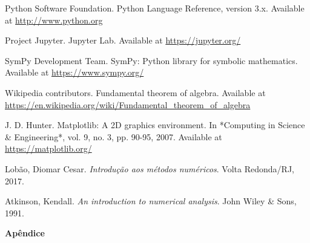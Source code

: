 \documentclass{article}
\begin{document}
\newpage
\begin{thebibliography}{9}
 Python Software Foundation. Python Language Reference, version 3.x. Available at \url{http://www.python.org}

 Project Jupyter. Jupyter Lab. Available at \url{https://jupyter.org/}

 SymPy Development Team. SymPy: Python library for symbolic mathematics. Available at \url{https://www.sympy.org/}

 Wikipedia contributors. Fundamental theorem of algebra. Available at \url{https://en.wikipedia.org/wiki/Fundamental_theorem_of_algebra}

 J. D. Hunter. Matplotlib: A 2D graphics environment. In *Computing in Science \& Engineering*, vol. 9, no. 3, pp. 90-95, 2007. Available at \url{https://matplotlib.org/}

Lobão, Diomar Cesar.
\textit{Introdução aos métodos numéricos}.
Volta Redonda/RJ, 2017.

Atkinson, Kendall. 
\textit{An introduction to numerical analysis}. 
John Wiley \& Sons, 1991.


\end{thebibliography}

\thispagestyle{empty} %
\newpage
\thispagestyle{empty} %
\begin{center}
    \vspace*{\fill} %
    \Huge{\textbf{Apêndice}} %
    \vspace*{\fill} %
\end{center}
\end{document}

